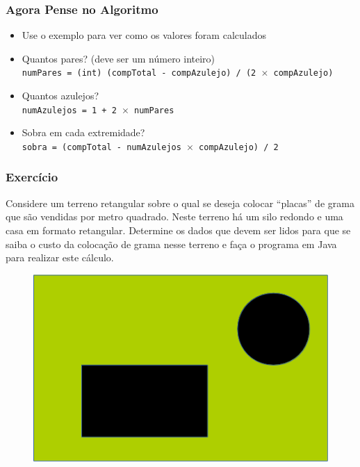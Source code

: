 \documentclass[xcolor={dvipsnames,table},aspectratio=169]{beamer}
\begin{document}
\begin{frame}\frametitle{Agora Pense no Algoritmo}
\begin{itemize}
	\item Use o exemplo para ver como os valores foram calculados
	\item Quantos pares? (deve ser um número inteiro)\\
		\texttt{numPares = (int) (compTotal - compAzulejo) / (2 $\times$ compAzulejo)}
	\item Quantos azulejos?\\
		\texttt{numAzulejos = 1 + 2 $\times$ numPares}
	\item Sobra em cada extremidade?\\
		\texttt{sobra = (compTotal - numAzulejos $\times$ compAzulejo) / 2}
\end{itemize}
\end{frame}

\begin{frame}\frametitle{Exercício}
Considere um terreno retangular sobre o qual se deseja colocar ``placas'' de grama que são vendidas por metro quadrado. Neste terreno há um silo redondo e uma casa em formato retangular. Determine os dados que devem ser lidos para que se saiba o custo da colocação de grama nesse terreno e faça o programa em Java para realizar este cálculo.
\begin{figure}[h]
	\includegraphics[height=0.25\paperheight,center]{pucrs-ep-fprog-unidade_02-tipos_de_dados_fundamentais-laminas-problema.png}
\end{figure}
\end{frame}

\end{document}
